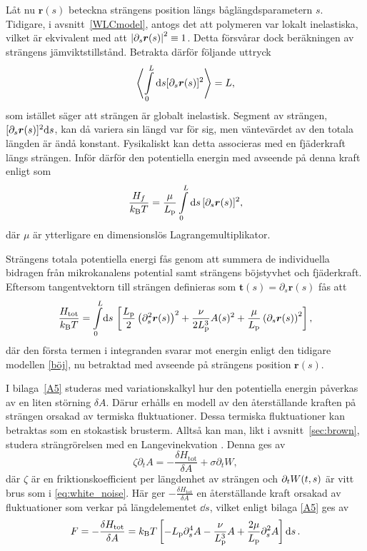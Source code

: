 Låt nu $\mathbf{r}(s)$ beteckna strängens position längs båglängdsparametern $s$. Tidigare, i avsnitt~\ref{WLCmodel}, antogs det att polymeren var lokalt inelastiska, vilket är ekvivalent med att $\abs{\partial_{s}\boldsymbol{r}(s)}^2\equiv1$. Detta försvårar dock beräkningen av strängens jämviktstillstånd. Betrakta därför följande uttryck
\begin{equation}\label{jäm2}
\ev{\int_{0}^{L}\dd s[\partial_{s}\mathbf{r}(s)]^2}=L,
\end{equation}
som istället säger att strängen är globalt inelastisk. Segment av strängen, $[\partial_s\boldsymbol{r}(s)]^2\!\dd{s}$, kan då variera sin längd var för sig, men väntevärdet av den totala längden är ändå konstant. Fysikaliskt kan detta associeras med en fjäderkraft längs strängen. Inför därför den potentiella energin med avseende på denna kraft enligt \cite{Harnau&Reineker1999} som
\begin{equation}
\frac{H_{f}}{\kbT}=\frac{\mu}{L_\text{p}}\int_{0}^{L}\dd s\,[\partial_{s}\mathbf{r}(s)]^{2},
\end{equation}
där $\mu$ är ytterligare en dimensionslös Lagrangemultiplikator.

Strängens totala potentiella energi fås genom att summera de individuella bidragen från mikrokanalens potential samt strängens böjstyvhet och fjäderkraft. Eftersom tangentvektorn till strängen definieras som $\mathbf{t}(s)=\partial_{s}\mathbf{r}(s)$ fås att
\begin{equation}
\label{Htot}
    \frac{H_\text{tot}}{\kbT}=\int_{0}^{L}\!\dd{s}\,\left[\frac{L_\text{p}}{2}\left(\partial_{s}^{2}\mathbf{r}(s)\right)^2 + \frac{\nu}{2L_\text{p}^3} A(s)^{2}+\frac{\mu}{L_\text{p}}\left(\partial_{s}\mathbf{r}(s)\right)^{2}\right],
\end{equation}
där den första termen i integranden svarar mot energin enligt den tidigare modellen \eqref{böj}, nu betraktad med avseende på strängens position $\mathbf{r}(s)$.

I bilaga~\ref{A5} studeras med variationskalkyl hur den potentiella energin påverkas av en liten störning $\delta A$. Därur erhålls en modell av den återställande kraften på strängen orsakad av termiska fluktuationer. Dessa termiska fluktuationer kan betraktas som en stokastisk brusterm. Alltså kan man, likt i avsnitt~\ref{sec:brown}, studera strängrörelsen med en Langevinekvation \cite{Bullerjahn2011}. Denna ges av 
\begin{equation}\label{mikrokanel}
\zeta\partial_{t}A=-\frac{\delta H_\text{tot}}{\delta A}+\sigma\partial_{t}W,
\end{equation}
där $\zeta$ är en friktionskoefficient per längdenhet av strängen och $\partial_tW(t,s)$ är vitt brus som i \eqref{eq:white_noise}. 
Här ger $-\frac{\delta H_\text{tot}}{\delta A}$ en återställande kraft orsakad av fluktuationer som verkar på längdelementet $\dd{s}$, vilket enligt bilaga \ref{A5} ges av \
\begin{equation}
F=-\frac{\delta H_\text{tot}}{\delta A} = k_{\text{B}}T\left[-L_\text{p}\partial_s^4A-\frac{\nu}{L_\text{p}^3}A+\frac{2\mu}{L_\text{p}}\partial_s^2A \right]\dd{s} .
\end{equation}

